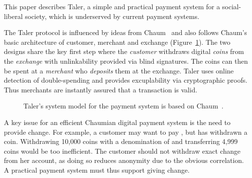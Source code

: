 \documentclass{llncs}
\begin{document}
This paper describes Taler, a simple and practical payment system for
a social-liberal society, which is underserved by
current payment systems.

The Taler protocol is influenced by ideas from
Chaum~\cite{chaum1983blind} and also follows Chaum's basic
architecture of customer, merchant and exchange
(Figure~\ref{fig:cmm}).  The two designs share the key first step
where the {\em customer} withdraws digital {\em coins} from the {\em
  exchange} with unlinkability provided via blind signatures.  The
coins can then be spent at a {\em merchant} who {\em deposits} them at
the exchange.  Taler uses online detection of double-spending and
provides excuplability via cryptographic proofs.  Thus merchants are
instantly assured that a transaction is valid.

\begin{figure}[h]
\centering
{}
\caption{Taler's system model for the payment system is based on Chaum~\cite{chaum1983blind}.}
\label{fig:cmm}
\end{figure}

A key issue for an efficient Chaumian digital payment system is the
need to provide change.  For example, a customer may want to pay
, but has withdrawn a  coin.  Withdrawing 10,000
coins with a denomination of  and transferring 4,999 coins would
be too inefficient.  The customer should not
withdraw exact change from her account, as doing so reduces anonymity
due to the obvious correlation.  A practical payment system must thus
support giving change.
\end{document}

